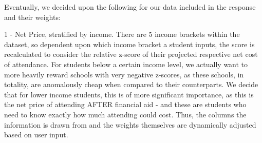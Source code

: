 \documentclass{article}
\begin{document}
Eventually, we decided upon the following for our data included in the response and their weights:


1 - Net Price, stratified by income. There are 5 income brackets within the dataset, so dependent upon which income bracket a student inputs, the score is recalculated to consider the relative z-score of their projected respective net cost of attendance. For students below a certain income level, we actually want to more heavily reward schools with very negative z-scores, as these schools, in totality, are anomalously cheap when compared to their counterparts. We decide that for lower income students, this is of more significant importance, as this is the net price of attending AFTER financial aid - and these are students who need to know exactly how much attending could cost. Thus, the columns the information is drawn from and the weights themselves are dynamically adjusted based on user input.
\end{document}

